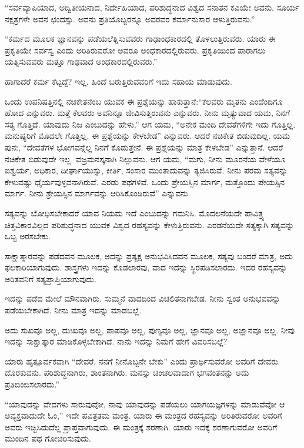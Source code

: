 \vskip 6pt

“ಸರ್ವವ್ಯಾಪಿಯಾದ, ಅದ್ವಿತೀಯನಾದ, ನಿರ್ದೇಹಿಯಾದ, ಪರಿಶುದ್ಧನಾದ ವಿಶ್ವದ ಸನಾತನ ಕವಿಯೇ ಅವನು. ಸೂರ್ಯ ನಕ್ಷತ್ರಗಳೇ ಅವನ ಛಂದಸ್ಸು. ಅವನು ಪ್ರತಿಯೊಬ್ಬರನ್ನೂ ಅವರವರ ಕರ್ಮಾನುಸಾರ ಆಳುತ್ತಿರುವನು.”

\vskip 6pt

“ಕರ್ಮದ ಮೂಲಕ ಜ್ಞಾನವನ್ನು ಪಡೆಯಲೆತ್ನಿಸುವವರು ಗಾಢಾಂಧಕಾರದಲ್ಲಿ ತೊಳಲುತ್ತಿರುವರು. ಯಾರು ಈ ಪ್ರಕೃತಿಯೇ ಸರ್ವಸ್ವ ಎಂದು ಅರಿತಿರುವರೋ ಅವರೂ ಅಂಧಕಾರದಲ್ಲಿರುವರು. ಪ್ರಕೃತಿಯಿಂದ ಪಾರಾಗಲು ಯತ್ನಿಸುವವರು ಮತ್ತೂ ಗಾಢವಾದ ಅಂಧಕಾರದಲ್ಲಿರುವರು.”

\vskip 6pt

ಹಾಗಾದರೆ ಕರ್ಮ ಕೆಟ್ಟದ್ದೆ? ಇಲ್ಲ. ಹಿಂದೆ ಬರುತ್ತಿರುವವರಿಗೆ ಇದು ಸಹಾಯ ಮಾಡುವುದು.

\vskip 6pt

ಒಂದು ಉಪನಿಷತ್ತಿನಲ್ಲಿ ನಚಿಕೇತನೆಂಬ ಯುವಕ ಈ ಪ್ರಶ್ನೆಯನ್ನು ಹಾಕುತ್ತಾನೆ:\break “ಕೆಲವರು ಮೃತನು ಎಂದೆಂದಿಗೂ ಹೋದ ಎನ್ನುವರು. ಮತ್ತೆ ಕೆಲವರು ಅವನಿನ್ನೂ ಜೀವಿಸುತ್ತಿರುವನು ಎನ್ನುವರು. ನೀನು ಮೃತ್ಯುವಾದ ಯಮ, ನಿನಗೆ ಸತ್ಯ ಗೊತ್ತಿದೆ. ಯಾವುದು ನಿಜ ಎಂಬುದನ್ನು ಹೇಳು.” ಆಗ ಯಮ, “ಅನೇಕ ಮಂದಿ ದೇವತೆಗಳಿಗೇ ಇದು ಗೊತ್ತಿಲ್ಲ. ಮನುಷ್ಯರಿಗೆ ಮೊದಲೇ ಗೊತ್ತಿಲ್ಲ. ಈ ಪ್ರಶ್ನೆಯನ್ನು ಕೇಳಬೇಡ” ಎನ್ನುವರು. ಆದರೆ ನಚಿಕೇತ ಬಿಡುವುದಿಲ್ಲ. ಯಮ ಪುನಃ, “ದೇವತೆಗಳ ಭೋಗವನ್ನೆಲ್ಲ ನಿನಗೆ ಕೊಡುತ್ತೇನೆ. ಈ ಪ್ರಶ್ನೆಯನ್ನು ಮಾತ್ರ ಕೇಳಬೇಡ” ಎನ್ನುತ್ತಾನೆ. ಆದರೆ ನಚಿಕೇತ ಬಿಡುವುದೇ ಇಲ್ಲ. ವಜ್ರಮನಸ್ಕನಾಗಿ ನಿಲ್ಲುವನು. ಆಗ ಯಮ, “ಮಗು, ನೀನು ಮೂರನೆಯ ವೇಳೆಯೂ ಐಶ್ವರ್ಯ, ಅಧಿಕಾರ, ದೀರ್ಘಾಯುಸ್ಸು, ಕೀರ್ತಿ, ಸಂಸಾರ ಮುಂತಾದುವನ್ನು ತ್ಯಜಿಸಿರುವೆ. ನೀನು ಪರಮ ಸತ್ಯವನ್ನು ಕೇಳುವಷ್ಟು ಧೈರ್ಯವುಳ್ಳವನಾಗಿರುವೆ. ಎರಡು ಪಥಗಳಿವೆ. ಒಂದು ಪ್ರೇಯಸ್ಸಿನ ಮಾರ್ಗ, ಮತ್ತೊಂದು ಪೇಯಸ್ಸಿನ ಮಾರ್ಗ. ನೀನು ಶ್ರೇಯಸ್ಸಿನ ಮಾರ್ಗವನ್ನು ಆರಿಸಿಕೊಂಡಿರುವೆ” ಎನ್ನುವನು.

\vskip 6pt

ಸತ್ಯವನ್ನು ಬೋಧಿಸಬೇಕಾದರೆ ಯಾವ ನಿಯಮ ಇದೆ ಎಂಬುದನ್ನು ಗಮನಿಸಿ. ಮೊದಲನೆಯದೇ ಪಾವಿತ್ರ್ಯ ಚಿತ್ತವಿಕಾರವಿಲ್ಲದ ಪರಿಶುದ್ಧನಾದ ಯುವಕ ವಿಶ್ವದ ರಹಸ್ಯವನ್ನು ಕೇಳುತ್ತಿರುವನು. ಎರಡನೆಯದೇ ಸತ್ಯಕ್ಕಾಗಿ ಸತ್ಯವನ್ನು ಒಬ್ಬ ಅರಸಬೇಕು.

\vskip 6pt

ಸಾಕ್ಷಾತ್ಕಾರವನ್ನು ಪಡೆದವನ ಮೂಲಕ, ಅದನ್ನು ಪ್ರತ್ಯಕ್ಷ ಅನುಭವಿಸಿದವನ ಮೂಲಕ, ಸತ್ಯವು ಬಂದರೆ ಮಾತ್ರ, ಅದು ಫಲಕಾರಿಯಾಗುವುದು. ಶಾಸ್ತ್ರಗಳು ಇದನ್ನು ಕೊಡಲಾರವು, ವಾದ ಇದನ್ನು ಸ್ಥಿರಪಡಿಸಲಾರದು. ಇದರ ರಹಸ್ಯವನ್ನು ಅರಿತವನಿಗೆ ಸತ್ಯ\break ಪ್ರಾಪ್ತಿಯಾಗುವುದು.

\vskip 6pt

ಇದನ್ನು ಪಡೆದ ಮೇಲೆ ಮೌನವಾಗಿರು. ಸುಮ್ಮನೆ ವಾದದಿಂದ ವಿಚಲಿತನಾಗಬೇಡ. ನೀನು ಸ್ವಂತ ಅನುಭವವನ್ನು ಪಡೆಯಬೇಕಾಗಿದೆ. ನೀನು ಮಾತ್ರ ಇದನ್ನು ಮಾಡಬಲ್ಲೆ.

\vskip 6pt

ಅದು ಸುಖವೂ ಅಲ್ಲ, ದುಃಖವೂ ಅಲ್ಲ, ಪಾಪವೂ ಅಲ್ಲ, ಪುಣ್ಯವೂ ಅಲ್ಲ, ಜ್ಞಾನವೂ ಅಲ್ಲ, ಅಜ್ಞಾನವೂ ಅಲ್ಲ. ನೀವು ಇದನ್ನು ಸಾಕ್ಷಾತ್ಕಾರ ಮಾಡಿಕೊಳ್ಳಬೇಕಾಗಿದೆ. ನಾನು ಇದನ್ನು ನಿಮಗೆ ಹೇಗೆ ವಿವರಿಸಬಲ್ಲೆ?

\vskip 6pt

ಯಾರು ಹೃತ್ಪೂರ್ವಕವಾಗಿ “ದೇವರೆ, ನನಗೆ ನೀನೊಬ್ಬನೇ ಬೇಕು” ಎಂದು ಪ್ರಾರ್ಥಿಸುವರೋ ಅವರಿಗೆ ದೇವರು ದೊರಕುವನು. ಪರಿಶುದ್ಧನಾಗಿರು, ಶಾಂತನಾಗಿರು. ಮನಸ್ಸು ಚಂಚಲವಾದಾಗ ಭಗವಂತನನ್ನು ಅದು ಪ್ರತಿಬಿಂಬಿಸಲಾರದು.”

\vskip 6pt

“ಯಾವುದನ್ನು ವೇದಗಳು ಸಾರುವುವೋ, ನಾವು ಯಾವುದನ್ನು ಪಡೆಯಲು ಯಾಗಯಜ್ಞಗಳನ್ನು ಮಾಡುವೆವೋ ಆ ಅವ್ಯಕ್ತವಾದುದೇ ಓಂ,” ಇದೇ ಪವಿತ್ರತಮ ಮಂತ್ರ. ಯಾರು ಈ ಮಂತ್ರದ ರಹಸ್ಯವನ್ನು ಅರಿತಿರುವರೋ ಅವರಿಗೆ ಅವರು ಇಚ್ಛಿಸಿದುದೆಲ್ಲ ಪ್ರಾಪ್ತವಾಗುವುದು. ಈ ಮಂತ್ರಕ್ಕೆ ಶರಣಾಗಿ. ಯಾರು ಇದಕ್ಕೆ ಶರಣಾಗುವರೋ ಅವರಿಗೆ ಮುಂದಿನ ಪಥ ಗೋಚರಿಸುವುದು.

